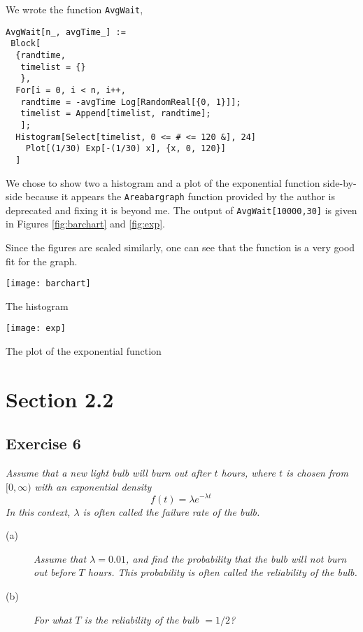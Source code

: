 \documentclass{tufte-handout}
\begin{document}
We wrote the function \lstinline$AvgWait$,

\begin{lstlisting}
AvgWait[n_, avgTime_] :=
 Block[
  {randtime,
   timelist = {}
   },
  For[i = 0, i < n, i++,
   randtime = -avgTime Log[RandomReal[{0, 1}]];
   timelist = Append[timelist, randtime];
   ];
  Histogram[Select[timelist, 0 <= # <= 120 &], 24]
    Plot[(1/30) Exp[-(1/30) x], {x, 0, 120}]
  ]
\end{lstlisting}
We chose to show two a histogram and a plot of the exponential
function side-by-side because it appears the \lstinline$Areabargraph$
function provided by the author is deprecated and fixing it is beyond
me. The output of \lstinline$AvgWait[10000,30]$ is given in Figures
\ref{fig:barchart} and \ref{fig:exp}.

Since the figures are scaled similarly, one can see that the function
is a very good fit for the graph.

\begin{marginfigure}
  \centering
  \texttt{[image: barchart]}
  \caption{The histogram}
  \label{fig:barchart}
\end{marginfigure}

\begin{marginfigure}
  \texttt{[image: exp]}
  \caption{The plot of the exponential function}
  \label{fig:exp}
\end{marginfigure}

\section{Section 2.2}
\subsection{Exercise 6}
\begin{description}
\item \emph{Assume that a new light bulb will burn out after $t$
    hours, where $t$ is chosen from $[0,\infty)$ with an exponential
    density \[ f(t) = \lambda e^{-\lambda t} \, \]
    In this context, $\lambda$ is often called the \emph{failure
      rate} of the bulb.}
  \begin{description}
  \item [(a)] \emph{Assume that $\lambda = 0.01$, and find the probability
    that the bulb will \emph{not} burn out before $T$ hours. This
    probability is often called the \emph{reliability} of the bulb.}
  \item [(b)] \emph{For what $T$ is the reliability of the bulb $= 1/2$?}
  \end{description}
\end{description}
\end{document}
